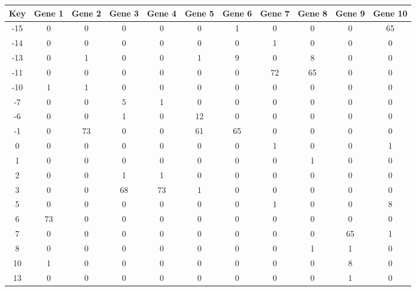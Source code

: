 \begin{tabular}{|c|c|c|c|c|c|c|c|c|c|c|}
\hline
Key & Gene 1 & Gene 2 & Gene 3 & Gene 4 & Gene 5 & Gene 6 & Gene 7 & Gene 8 & Gene 9 & Gene 10 \\
\hline
-15 & 0 & 0 & 0 & 0 & 0 & 1 & 0 & 0 & 0 & 65 \\
-14 & 0 & 0 & 0 & 0 & 0 & 0 & 1 & 0 & 0 & 0 \\
-13 & 0 & 1 & 0 & 0 & 1 & 9 & 0 & 8 & 0 & 0 \\
-11 & 0 & 0 & 0 & 0 & 0 & 0 & 72 & 65 & 0 & 0 \\
-10 & 1 & 1 & 0 & 0 & 0 & 0 & 0 & 0 & 0 & 0 \\
-7 & 0 & 0 & 5 & 1 & 0 & 0 & 0 & 0 & 0 & 0 \\
-6 & 0 & 0 & 1 & 0 & 12 & 0 & 0 & 0 & 0 & 0 \\
-1 & 0 & 73 & 0 & 0 & 61 & 65 & 0 & 0 & 0 & 0 \\
0 & 0 & 0 & 0 & 0 & 0 & 0 & 1 & 0 & 0 & 1 \\
1 & 0 & 0 & 0 & 0 & 0 & 0 & 0 & 1 & 0 & 0 \\
2 & 0 & 0 & 1 & 1 & 0 & 0 & 0 & 0 & 0 & 0 \\
3 & 0 & 0 & 68 & 73 & 1 & 0 & 0 & 0 & 0 & 0 \\
5 & 0 & 0 & 0 & 0 & 0 & 0 & 1 & 0 & 0 & 8 \\
6 & 73 & 0 & 0 & 0 & 0 & 0 & 0 & 0 & 0 & 0 \\
7 & 0 & 0 & 0 & 0 & 0 & 0 & 0 & 0 & 65 & 1 \\
8 & 0 & 0 & 0 & 0 & 0 & 0 & 0 & 1 & 1 & 0 \\
10 & 1 & 0 & 0 & 0 & 0 & 0 & 0 & 0 & 8 & 0 \\
13 & 0 & 0 & 0 & 0 & 0 & 0 & 0 & 0 & 1 & 0 \\
\hline
\end{tabular}